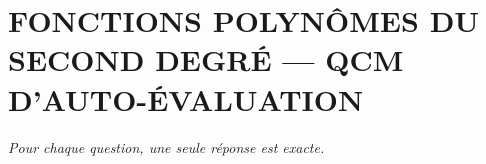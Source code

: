 
\section*{\textcolor{chapcolor}{\MakeUppercase{Fonctions polynômes du second degré — QCM d'auto-évaluation}}}

\begin{center}
\textit{Pour chaque question, une seule réponse est exacte.}
\end{center}


